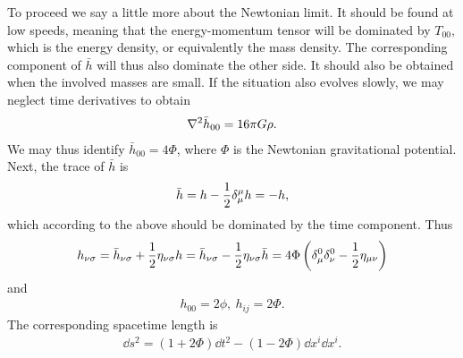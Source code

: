 To proceed we say a little more about the Newtonian limit. It should be found at low speeds, meaning that the energy-momentum tensor will be dominated by $T_{00}$, which is the energy density, or equivalently the mass density. The corresponding component of $\bar{h}$ will thus also dominate the other side. It should also be obtained when the involved masses are small. If the situation also evolves slowly, we may neglect time derivatives to obtain
\begin{align*}
	\laplacian{\bar{h}_{00}} = 16\pi G\rho.
\end{align*}
We may thus identify $\bar{h}_{00} = 4\Phi$, where $\Phi$ is the Newtonian gravitational potential. Next, the trace of $\bar{h}$ is
\begin{align*}
	\bar{h} = h - \frac{1}{2}\kdelta{\mu}{\mu}h = -h,
\end{align*}
which according to the above should be dominated by the time component. Thus
\begin{align*}
	h_{\nu\sigma} = \bar{h}_{\nu\sigma} + \frac{1}{2}\eta_{\nu\sigma}h = \bar{h}_{\nu\sigma} - \frac{1}{2}\eta_{\nu\sigma}\bar{h} = 4\Phi\left(\kdelta{0}{\mu}\kdelta{0}{\nu} - \frac{1}{2}\eta_{\mu\nu}\right)
\end{align*}
and
\begin{align*}
	h_{00} = 2\phi,\ h_{ij} = 2\Phi.
\end{align*}
The corresponding spacetime length is
\begin{align*}
	\dd{s}^{2} = (1 + 2\Phi)\dd{t}^{2} - (1 - 2\Phi)\dd{x^{i}}\dd{x^{i}}.
\end{align*}

